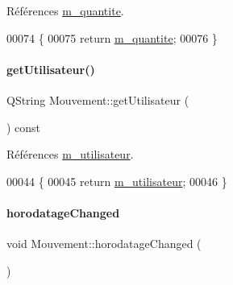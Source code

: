 Références \hyperlink{class_mouvement_ab6040d52ca99ef88d253b1742e70ffd3}{m\+\_\+quantite}.


\begin{DoxyCode}
00074 \{
00075     \textcolor{keywordflow}{return} \hyperlink{class_mouvement_ab6040d52ca99ef88d253b1742e70ffd3}{m\_quantite};
00076 \}
\end{DoxyCode}
\mbox{\label{class_mouvement_a80c65d0cba3e7918f7112fd7f85a1471}} 
\paragraph{\texorpdfstring{get\+Utilisateur()}{getUtilisateur()}}
{\footnotesize\ttfamily Q\+String Mouvement\+::get\+Utilisateur (\begin{DoxyParamCaption}{ }\end{DoxyParamCaption}) const}



Références \hyperlink{class_mouvement_adee253bf00365d1cb4c45bd58d8b3e58}{m\+\_\+utilisateur}.


\begin{DoxyCode}
00044 \{
00045     \textcolor{keywordflow}{return} \hyperlink{class_mouvement_adee253bf00365d1cb4c45bd58d8b3e58}{m\_utilisateur};
00046 \}
\end{DoxyCode}
\mbox{\label{class_mouvement_a08d9242a25862702b483ed2f0a3c92e8}} 
\paragraph{\texorpdfstring{horodatage\+Changed}{horodatageChanged}}
{\footnotesize\ttfamily void Mouvement\+::horodatage\+Changed (\begin{DoxyParamCaption}{ }\end{DoxyParamCaption})\hspace{0.3cm}{\ttfamily [signal]}}

\mbox{\label{class_mouvement_a256e46ab458dccb15b3e631ed239f2d0}} 
